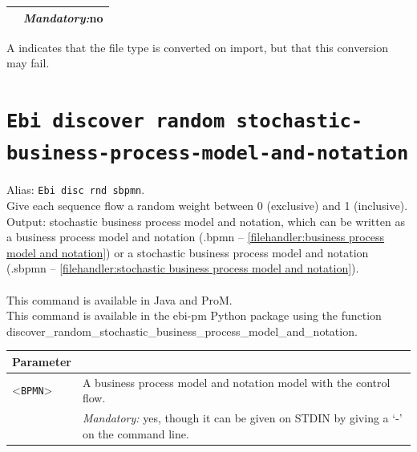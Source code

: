 {\begin{tabularx}{\linewidth}{lX}
&\textit{Mandatory:}\quad no\\
\bottomrule
\end{tabularx}
A \textdagger{} indicates that the file type is converted on import, but that this conversion may fail.
\clearpage\section{\texttt{Ebi discover random stochastic-business-process-model-and-notation}}
\label{command:Ebi discover random stochastic-business-process-model-and-notation}
Alias: \texttt{Ebi disc rnd sbpmn}.\\
Give each sequence flow a random weight between 0 (exclusive) and 1 (inclusive).\\
\noindent Output: stochastic business process model and notation, which can be written as a business process model and notation (.bpmn -- \cref{filehandler:business process model and notation}) or a stochastic business process model and notation (.sbpmn -- \cref{filehandler:stochastic business process model and notation}).\\
\\This command is available in Java and ProM.
\\This command is available in the ebi-pm Python package using the function discover\_random\_stochastic\_business\_process\_model\_and\_notation.
\begin{tabularx}{\linewidth}{lX}
\toprule
Parameter \\\midrule
<\texttt{BPMN}>&A business process model and notation model with the control flow.\\
&\textit{Mandatory:} \quad yes, though it can be given on STDIN by giving a `-' on the command line.\\

\end{tabularx}}
